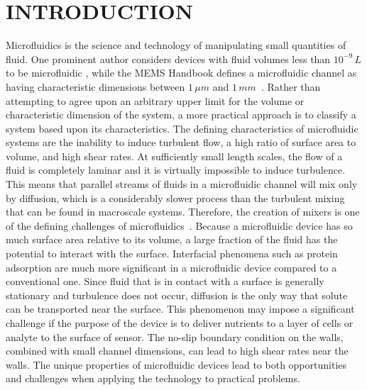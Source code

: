 
\chapter{INTRODUCTION}

Microfluidics is the science and technology of manipulating small
quantities of fluid. One prominent author considers devices with fluid
volumes less than $10^{-9}\, L$ to be microfluidic \cite{Whitesides2006},
while the MEMS Handbook defines a microfluidic channel as having characteristic
dimensions between $1\,\mu m$ and $1\, mm$~\cite{Sharp2002}. Rather
than attempting to agree upon an arbitrary upper limit for the volume
or characteristic dimension of the system, a more practical approach
is to classify a system based upon its characteristics. The defining
characteristics of microfluidic systems are the inability to induce
turbulent flow, a high ratio of surface area to volume, and high shear
rates. At sufficiently small length scales, the flow of a fluid is
completely laminar and it is virtually impossible to induce turbulence.
This means that parallel streams of fluids in a microfluidic channel
will mix only by diffusion, which is a considerably slower process
than the turbulent mixing that can be found in macroscale systems.
Therefore, the creation of mixers is one of the defining challenges
of microfluidics~\cite{Nguyen2005}. Because a microfluidic device
has so much surface area relative to its volume, a large fraction
of the fluid has the potential to interact with the surface. Interfacial
phenomena such as protein adsorption are much more significant in
a microfluidic device compared to a conventional one. Since fluid
that is in contact with a surface is generally stationary and turbulence
does not occur, diffusion is the only way that solute can be transported
near the surface. This phenomenon may impose a significant challenge
if the purpose of the device is to deliver nutrients to a layer of
cells or analyte to the surface of sensor. The no-slip boundary condition
on the walls, combined with small channel dimensions, can lead to
high shear rates near the walls. The unique properties of microfluidic
devices lead to both opportunities and challenges when applying the
technology to practical problems.

